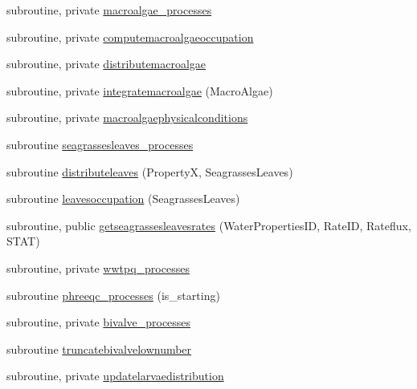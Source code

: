 \begin{DoxyCompactItemize}
\item 
subroutine, private \mbox{\hyperlink{namespacemodulewaterproperties_aa89a84314cb0905ce7ee9f02c7c35393}{macroalgae\+\_\+processes}}
\item 
subroutine, private \mbox{\hyperlink{namespacemodulewaterproperties_a196db184712b743908b747b05495bc60}{computemacroalgaeoccupation}}
\item 
subroutine, private \mbox{\hyperlink{namespacemodulewaterproperties_a45571c439a7d4a05be3b427eb5ff0b9a}{distributemacroalgae}}
\item 
subroutine, private \mbox{\hyperlink{namespacemodulewaterproperties_a27e3b4870b21a44136c19ab777be7e33}{integratemacroalgae}} (Macro\+Algae)
\item 
subroutine, private \mbox{\hyperlink{namespacemodulewaterproperties_af4c3f5f2d82b97b5112ee2c44f4dc5a3}{macroalgaephysicalconditions}}
\item 
subroutine \mbox{\hyperlink{namespacemodulewaterproperties_adf800c8c0d5bdc30d00d4b10c88f9693}{seagrassesleaves\+\_\+processes}}
\item 
subroutine \mbox{\hyperlink{namespacemodulewaterproperties_a60f5e5b09c032f11f1b1a75f101398a0}{distributeleaves}} (PropertyX, Seagrasses\+Leaves)
\item 
subroutine \mbox{\hyperlink{namespacemodulewaterproperties_ac74bdef93cc8e54e691452462dce15da}{leavesoccupation}} (Seagrasses\+Leaves)
\item 
subroutine, public \mbox{\hyperlink{namespacemodulewaterproperties_ae3241f210c7340a59547a54db80870aa}{getseagrassesleavesrates}} (Water\+Properties\+ID, Rate\+ID, Rateflux, S\+T\+AT)
\item 
subroutine, private \mbox{\hyperlink{namespacemodulewaterproperties_ad35241441c35aaaf61a0529c6be215e9}{wwtpq\+\_\+processes}}
\item 
subroutine \mbox{\hyperlink{namespacemodulewaterproperties_a24e8f85633a4f1ac903cfa366e4669d7}{phreeqc\+\_\+processes}} (is\+\_\+starting)
\item 
subroutine, private \mbox{\hyperlink{namespacemodulewaterproperties_aa43273d07b646deb6e4c72e757b19fbd}{bivalve\+\_\+processes}}
\item 
subroutine \mbox{\hyperlink{namespacemodulewaterproperties_ab62d1ee17d0bdd78beb327d8dd8c2f4d}{truncatebivalvelownumber}}
\item 
subroutine, private \mbox{\hyperlink{namespacemodulewaterproperties_a9362aa51fad7e9cae9cd548057855662}{updatelarvaedistribution}}
\item 

\end{DoxyCompactItemize}
